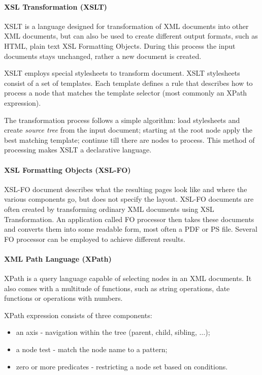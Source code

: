 \documentclass[11pt,oneside,final]{fithesis2}
\begin{document}
\paragraph*{XSL Transformation (XSLT)} 
XSLT is a language designed for transformation of XML documents into other XML documents, but can also be used to create different output formats, such as HTML, plain text XSL Formatting Objects. During this process the input documents stays unchanged, rather a new document is created. 

XSLT employs special stylesheets to transform document. XSLT stylesheets consist of a set of templates. Each template defines a rule that describes how to process a node that matches the template selector (most commonly an XPath expression). 

The transformation process follows a simple algorithm: load stylesheets and create \textit{source tree} from the input document; starting at the root node apply the best matching template; continue till there are nodes to process. This method of processing makes XSLT a declarative language.

\paragraph*{XSL Formatting Objects (XSL-FO)}
\label{xsl:xsl-fo}
XSL-FO document describes what the resulting pages look like and where the various components go, but does not specify the layout. XSL-FO documents are often created by transforming ordinary XML documents using XSL Transformation. An application called FO processor then takes these documents and converts them into some readable form, most often a PDF or PS file. Several FO processor can be employed to achieve different results.

\paragraph*{XML Path Language (XPath)}
\label{xsl:xpath}
XPath is a query language capable of selecting nodes in an XML documents. It also comes with a multitude of functions, such as string operations, date functions or operations with numbers. 

XPath expression consists of three components: 
\begin{itemize}
\item an axis - navigation within the tree (parent, child, sibling, $\ldots$);
\item a node test - match the node name to a pattern;
\item zero or more predicates - restricting a node set based on conditions.
\end{itemize}
\end{document}
